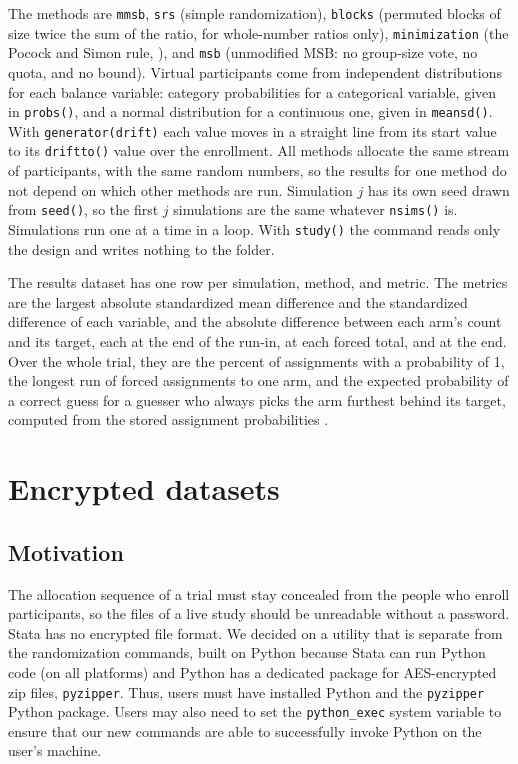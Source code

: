 \documentclass[bib]{statapress}
\begin{document}
\noindent The methods are \texttt{mmsb}, \texttt{srs} (simple randomization),
\texttt{blocks} (permuted blocks of size twice the sum of the ratio, for
whole-number ratios only),
\texttt{minimization} (the Pocock and Simon rule, \citealp{pocock1975}), and
\texttt{msb} (unmodified MSB: no group-size vote, no quota, and no bound).
Virtual participants come from independent distributions for each balance
variable: category probabilities for a categorical variable, given in
\texttt{probs()}, and a normal distribution for a continuous one, given in
\texttt{meansd()}. With \texttt{generator(drift)} each value moves in a straight
line from its start value to its \texttt{driftto()} value over the enrollment.
All methods allocate the same stream of participants, with the same random
numbers, so the results for one method do not depend on which other methods are
run. Simulation $j$ has its own seed drawn from \texttt{seed()}, so the first
$j$ simulations are the same whatever \texttt{nsims()} is. Simulations run one at
a time in a loop. With \texttt{study()} the command reads only the design and
writes nothing to the folder.

The results dataset has one row per simulation, method, and metric. The metrics
are the largest absolute standardized mean difference and the standardized
difference of each variable, and the absolute difference between each arm's
count and its target, each at the end of the run-in, at each forced total, and
at the end. Over the whole trial, they are the percent of assignments with a
probability of 1, the longest run of forced assignments to one arm, and the
expected probability of a correct guess for a guesser who always picks the arm
furthest behind its target, computed from the stored assignment probabilities
\citep{blackwell1957}.

\section{Encrypted datasets}
\label{sec:encrypt}

\subsection{Motivation}

The allocation sequence of a trial must stay concealed from the people who
enroll participants, so the files of a live study should be unreadable without a
password. Stata has no encrypted file format. We decided on a utility that is
separate from the randomization commands, built on
Python because Stata can run Python code (on all platforms) and Python has a dedicated package for
AES-encrypted zip files, \texttt{pyzipper}. Thus, users must have installed Python
and the \texttt{pyzipper} Python package.  Users may also need to set the \texttt{python\_exec}
system variable to ensure that our new commands are able to successfully invoke Python on 
the user's machine.
\end{document}
